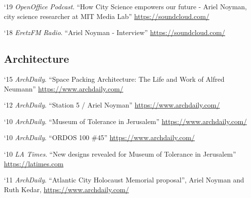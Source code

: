 \begin{tablist}
    \item[`19] \tab \textit{OpenOffice Podcast}. \enquote{How City Science empowers our future - Ariel Noyman, city science researcher at MIT Media Lab}
    \href{https://soundcloud.com/openofficepodcast/5-how-city-science-empowers-our-future-ariel-noyman-city-science-researcher-at-mit-media-lab}{https://soundcloud.com/}

    \item[`18] \tab \textit{EretzFM Radio}. \enquote{Ariel Noyman - Interview}
    \href{https://soundcloud.com/eretzfm/070119a-3}{https://soundcloud.com/}


    \subsection*{Architecture}
    \item[`15] \tab \textit{ArchDaily}. \enquote{Space Packing Architecture: The Life and Work of Alfred Neumann}
    \href{https://www.archdaily.com/633053/space-packing-architecture-the-life-and-work-of-alfred-neumann}{https://www.archdaily.com/}

    \item[`12] \tab \textit{ArchDaily}. \enquote{Station 5 / Ariel Noyman}
    \href{https://www.archdaily.com/117870/station-5-ariel-noyman}{https://www.archdaily.com/}

    \item[`10] \tab \textit{ArchDaily}. \enquote{Museum of Tolerance in Jerusalem}
    \href{https://www.archdaily.com/81319/museum-of-tolerance-in-jerusalem-chyutin-architects}{https://www.archdaily.com/}

    \item[`10] \tab \textit{ArchDaily}. \enquote{ORDOS 100 \#45}
    \href{https://www.archdaily.com/32535/ordos-100-45-efrat-kowalsky-architects}{https://www.archdaily.com/}

    \item[`10] \tab \textit{LA Times}. \enquote{New designs revealed for Museum of Tolerance in Jerusalem}
    \href{https://latimesblogs.latimes.com/culturemonster/2010/09/simon-wiesenthal-center-unveils-new-designs-for-museum-of-tolerance-in-jerusalem-.html}{https://latimes.com}


    \item[`11] \tab \textit{ArchDaily}. \enquote{Atlantic City Holocaust Memorial proposal}, Ariel Noyman and Ruth Kedar,
    \href{https://www.archdaily.com/92128/atlantic-city-holocaust-memorial-proposal-ariel-noyman-and-ruth-kedar}{https://www.archdaily.com/}


\end{tablist}

